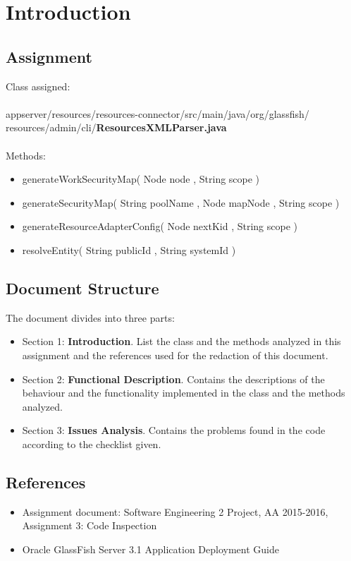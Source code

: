 
\section{Introduction}


\subsection{Assignment}
Class assigned:\\\\
appserver/resources/resources-connector/src/main/java/org/glassfish/\\ resources/admin/cli/\textbf{ResourcesXMLParser.java}\\
\\
Methods:
\begin{itemize}
\item generateWorkSecurityMap( Node node , String scope )
\item generateSecurityMap( String poolName , Node mapNode , String scope )
\item generateResourceAdapterConfig( Node nextKid , String scope )
\item resolveEntity( String publicId , String systemId )
\end{itemize}



\subsection{Document Structure}
The document divides into three parts:
\begin{itemize}

\item Section 1: \textbf{Introduction}. List the class and the methods analyzed in this assignment and the references used for the redaction of this document.

\item Section 2: \textbf{Functional Description}. Contains the descriptions of the behaviour and the functionality implemented in the class and the methods analyzed.

\item Section 3: \textbf{Issues Analysis}.
Contains the problems found in the code according to the checklist given. 
\end{itemize}

\subsection{References}

\begin{itemize}

\item Assignment document: Software Engineering 2 Project, AA 2015-2016, Assignment 3: Code Inspection
\item Oracle GlassFish Server 3.1 Application Deployment Guide
\end{itemize}

